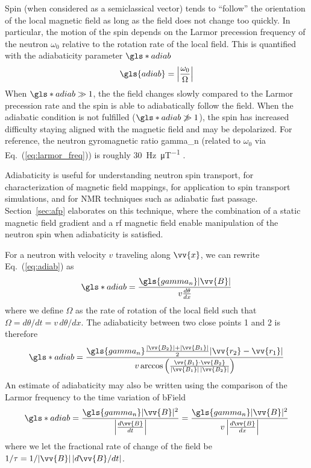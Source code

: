Spin (when considered as a semiclassical vector) tends to ``follow'' the orientation of the local magnetic field as long as the field does not change too quickly. In particular, the motion of the spin depends on the Larmor precession frequency of the neutron $\omega_0$ relative to the rotation rate of the local field. This is quantified with the adiabaticity parameter $\gls*{adiab}$ \cite{abragam1961principles}
%
\begin{gather}
    \gls{adiab}=\left| \frac{\omega_0}{\Omega} \right| \label{eq:adiab}
\end{gather}
%
When $\gls*{adiab}\gg 1$, the the field changes slowly compared to the Larmor precession rate and the spin is able to adiabatically follow the field. When the adiabatic condition is not fulfilled ($\gls*{adiab}\not\gg 1$), the spin has increased difficulty staying aligned with the magnetic field and may be depolarized. For reference, the neutron gyromagnetic ratio \gls{gamma_n} (related to $\omega_0$ via Eq.~(\ref{eq:larmor_freq})) is roughly \qty{30}{\hertz.\micro\tesla^{-1}} \cite{codata_2018}.

Adiabaticity is useful for understanding neutron spin transport, for characterization of magnetic field mappings, for application to spin transport simulations, and for NMR techniques such as adiabatic fast passage. Section~\ref{sec:afp} elaborates on this technique, where the combination of a static magnetic field gradient and a \acrshort{rf} magnetic field enable manipulation of the neutron spin when adiabaticity is satisfied. 

For a neutron with velocity $v$ traveling along $\vv{x}$, we can rewrite Eq.~(\ref{eq:adiab}) as
%
\begin{gather}
    \gls*{adiab}=\frac{ \gls{gamma_n}| \vv{B} |}{v\frac{d\theta}{dx}}
\end{gather}
%
where we define $\Omega$ as the rate of rotation of the local field such that $\Omega=d\theta/dt=v\,d\theta/dx$. The adiabaticity between two close points 1 and 2 is therefore
%
\begin{gather}
    \gls*{adiab}=\frac{\gls{gamma_n} \frac{ | \vv{B_2} | +| \vv{B_1}| }{2} | \vv{r_2} - \vv{r_1}|}
    {v\arccos \left( \frac{\vv{B_1}\cdot\vv{B_2}}{| \vv{B_1} | \, \vert \vv{B_2} | }\right)}
\end{gather}
%
An estimate of adiabaticity may also be written using the comparison of the Larmor frequency to the time variation of \gls*{bField}
%
\begin{gather}
    \gls*{adiab}=\frac{\gls{gamma_n}| \vv{B} | ^2}{\left| \frac{d\vv{B}}{dt} \right|}
    =\frac{\gls{gamma_n}| \vv{B} | ^2}{v\left| \frac{d\vv{B}}{dx} \right|}
\end{gather}
%
where we let the fractional rate of change of the field be $1/\tau = 1/ |\vv{B}|\,|d\vv{B}/dt|$.

